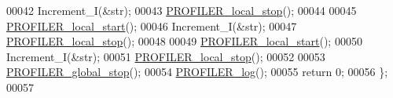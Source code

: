 \begin{DoxyCode}
00042     Increment\_I(&str);
00043     \hyperlink{_p_r_o_f_i_l_i_n_g__tools_8h_ad8354a6502e89adea8535f4029a15b5f}{PROFILER_local_stop}();
00044 
00045     \hyperlink{_p_r_o_f_i_l_i_n_g__tools_8h_a632f3afa2c72dd938e2a5d7e9c1e202e}{PROFILER_local_start}();
00046     Increment\_I(&str);
00047     \hyperlink{_p_r_o_f_i_l_i_n_g__tools_8h_ad8354a6502e89adea8535f4029a15b5f}{PROFILER_local_stop}();
00048 
00049     \hyperlink{_p_r_o_f_i_l_i_n_g__tools_8h_a632f3afa2c72dd938e2a5d7e9c1e202e}{PROFILER_local_start}();
00050     Increment\_I(&str);
00051     \hyperlink{_p_r_o_f_i_l_i_n_g__tools_8h_ad8354a6502e89adea8535f4029a15b5f}{PROFILER_local_stop}();
00052         
00053         \hyperlink{group___xD0_x9F_xD0_xBE_xD1_x80_xD1_x82_xD0_xB8_xD1_x80_xD1_x83_xD0_xB5_xD0_xBC_xD0_xB0_xD1_x8F_2ef1b31e26d7139e4bfe94879d1322e3_ga425fb9e92c3523ab2a3581d2cbefb5ce}{PROFILER_global_stop}();
00054         \hyperlink{group___xD0_x9F_xD0_xBE_xD1_x80_xD1_x82_xD0_xB8_xD1_x80_xD1_x83_xD0_xB5_xD0_xBC_xD0_xB0_xD1_x8F_2ef1b31e26d7139e4bfe94879d1322e3_ga2f57ecff908155818a48144e366f7c57}{PROFILER_log}();
00055         \textcolor{keywordflow}{return} 0;
00056 \};
00057 
\end{DoxyCode}
